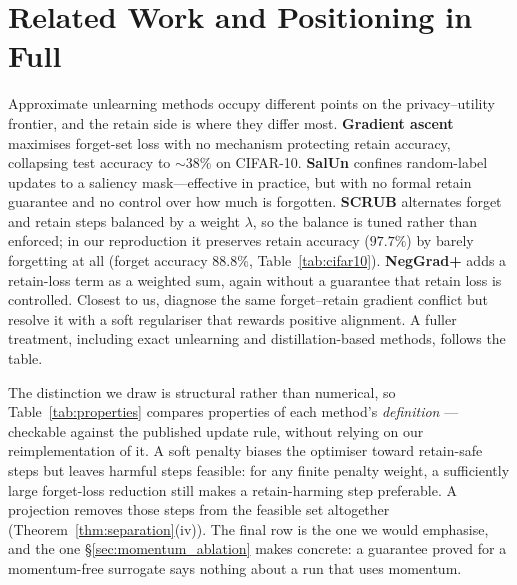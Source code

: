 \documentclass{article}
\theoremstyle{remark}
\theoremstyle{plain}
\begin{document}
\FloatBarrier


\appendix
\section{Related Work and Positioning in Full}\label{app:related}\label{sec:related_intro}

Approximate unlearning methods occupy different points on the privacy--utility
frontier, and the retain side is where they differ most. \textbf{Gradient
ascent} \citep{thudi2022unrolling} maximises forget-set loss with no mechanism
protecting retain accuracy, collapsing test accuracy to ${\sim}38\%$ on
CIFAR-10. \textbf{SalUn} \citep{fan2024salun} confines random-label updates to a
saliency mask---effective in practice, but with no formal retain guarantee and
no control over how much is forgotten. \textbf{SCRUB}
\citep{kurmanji2023unbounded} alternates forget and retain steps balanced by a
weight $\lambda$, so the balance is tuned rather than enforced; in our
reproduction it preserves retain accuracy ($97.7\%$) by barely forgetting at all
(forget accuracy $88.8\%$, Table~\ref{tab:cifar10}). \textbf{NegGrad+}
\citep{thudi2022unrolling} adds a retain-loss term as a weighted sum, again
without a guarantee that retain loss is controlled. Closest to us,
\citet{patel2025learning} diagnose the same forget--retain gradient conflict but
resolve it with a soft regulariser that rewards positive alignment. A fuller treatment, including exact unlearning and distillation-based methods, follows the table.

The distinction we draw is structural rather than numerical, so
Table~\ref{tab:properties} compares properties of each method's \emph{definition}
---checkable against the published update rule, without relying on our
reimplementation of it. A soft penalty biases the optimiser toward retain-safe
steps but leaves harmful steps feasible: for any finite penalty weight, a
sufficiently large forget-loss reduction still makes a retain-harming step
preferable. A projection removes those steps from the feasible set altogether
(Theorem~\ref{thm:separation}(iv)). The final row is the one we would emphasise,
and the one \S\ref{sec:momentum_ablation} makes concrete: a guarantee proved for
a momentum-free surrogate says nothing about a run that uses momentum.
\end{document}
